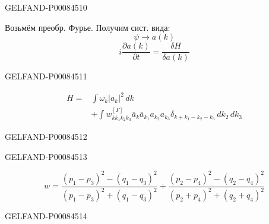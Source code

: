 \begin{GelfandAdjacentEvidence}{GELFAND-P000845}{10}


Возьмём преобр. Фурье. Получим сист. вида:
\[
\psi\to a(k)
\]
\[
i\frac{\partial a(k)}{\partial t}=\frac{\delta H}{\delta a(k)}
\]
\end{GelfandAdjacentEvidence}
\begin{GelfandAdjacentEvidence}{GELFAND-P000845}{11}


\[
\begin{aligned}
H={}&\int\omega_k|a_k|^2\,dk\\
&+\int w^{[\Gamma]}_{kk_1k_2k_3}
\bar a_k\bar a_{k_1}a_{k_2}a_{k_3}
\delta_{k+k_1-k_2-k_3}\,dk_2\,dk_3
\end{aligned}
\]
\end{GelfandAdjacentEvidence}
\begin{GelfandAdjacentEvidence}{GELFAND-P000845}{12}

\end{GelfandAdjacentEvidence}
\begin{GelfandAdjacentEvidence}{GELFAND-P000845}{13}


\[
w=\frac{(p_1-p_3)^2-(q_1-q_3)^2}{(p_1-p_3)^2+(q_1-q_3)^2}
+\frac{(p_2-p_4)^2-(q_2-q_4)^2}{(p_2+p_4)^2+(q_2+q_4)^2}
\]
\end{GelfandAdjacentEvidence}
\begin{GelfandAdjacentEvidence}{GELFAND-P000845}{14}

\end{GelfandAdjacentEvidence}



